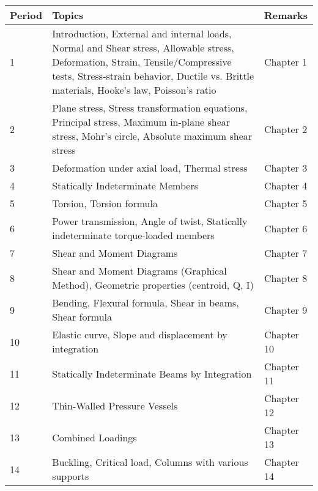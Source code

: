\documentclass[12pt]{article}
\begin{document}
\begin{enumerate}
\begin{tabularx}{\textwidth}{lXl}
    \toprule
    \textbf{Period} & \textbf{Topics} & \textbf{Remarks} \\
    \midrule
    1 & Introduction, External and internal loads, Normal and Shear stress, Allowable stress, Deformation, Strain, Tensile/Compressive tests, Stress-strain behavior, Ductile vs. Brittle materials, Hooke's law, Poisson's ratio & Chapter 1 \\
    2 & Plane stress, Stress transformation equations, Principal stress, Maximum in-plane shear stress, Mohr's circle, Absolute maximum shear stress & Chapter 2 \\
    3 & Deformation under axial load, Thermal stress & Chapter 3 \\
    4 & Statically Indeterminate Members & Chapter 4 \\
    5 & Torsion, Torsion formula & Chapter 5 \\
    6 & Power transmission, Angle of twist, Statically indeterminate torque-loaded members & Chapter 6 \\
    7 & Shear and Moment Diagrams & Chapter 7 \\
    8 & Shear and Moment Diagrams (Graphical Method), Geometric properties (centroid, Q, I) & Chapter 8 \\
    9 & Bending, Flexural formula, Shear in beams, Shear formula & Chapter 9 \\
    10 & Elastic curve, Slope and displacement by integration & Chapter 10 \\
    11 & Statically Indeterminate Beams by Integration & Chapter 11 \\
    12 & Thin-Walled Pressure Vessels & Chapter 12 \\
    13 & Combined Loadings & Chapter 13 \\
    14 & Buckling, Critical load, Columns with various supports & Chapter 14 \\
    \bottomrule
\end{tabularx}


\end{enumerate}
\end{document}
